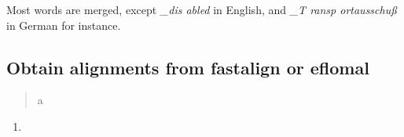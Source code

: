 Most words are merged, except \emph{\_dis abled} in English, and \emph{\_T ransp ortausschuß} in German for instance.

\subsection{Obtain alignments from fastalign or eflomal}



\begin{quote}
	a\\
\end{quote}

\begin{enumerate}
	\item 
\end{enumerate}